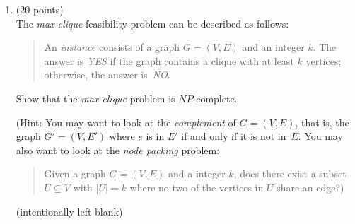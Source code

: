\documentclass[12pt]{article}
\begin{document}
\begin{enumerate}
%
%
%


   \item (20 points) \\
     The {\em max clique} feasibility problem can be described
     as follows:
     \begin{quote}
       An {\em instance} consists of a graph $G=(V,E)$ and an integer $k$.
       The answer is {\em YES} if the graph contains a clique with at
       least $k$ vertices; otherwise, the answer is~{\em NO}.
     \end{quote}
     Show that the {\em max clique} problem is $NP$-complete.

     (Hint: You may want to look at the {\em complement} of $G=(V,E)$,
     that is, the graph $G'=(V,E')$ where $e$ is in $E'$ if and only if
     it is not in~$E$.
     You may also want to look at the        {\em node packing} problem:
    \begin{quote}
        Given a graph $G=(V,E)$ and a integer $k$,
        does there exist a subset $U \subseteq V$
        with $\mid \! U \! \mid = k$
        where no two of the vertices in $U$ share an edge?)
   \end{quote}


\pagebreak

\addtocounter{page}{-1}
(intentionally left blank)

\pagebreak







\end{enumerate}
\end{document}

